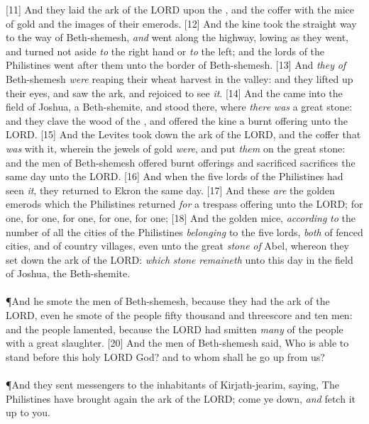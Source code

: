 [11] \textcolor[cmyk]{0.99998,1,0,0}{And they laid the ark of the LORD upon the , and the coffer with the mice of gold and the images of their emerods.}
[12] \textcolor[cmyk]{0.99998,1,0,0}{And the kine took the straight way to the way of Beth-shemesh, \emph{and} went along the highway, lowing as they went, and turned not aside \emph{to} the right hand or \emph{to} the left; and the lords of the Philistines went after them unto the border of Beth-shemesh.}
[13] \textcolor[cmyk]{0.99998,1,0,0}{And \emph{they} \emph{of} Beth-shemesh \emph{were} reaping their wheat harvest in the valley: and they lifted up their eyes, and saw the ark, and rejoiced to see \emph{it}.}
[14] \textcolor[cmyk]{0.99998,1,0,0}{And the  came into the field of Joshua, a Beth-shemite, and stood there, where \emph{there} \emph{was} a great stone: and they clave the wood of the , and offered the kine a burnt offering unto the LORD.}
[15] \textcolor[cmyk]{0.99998,1,0,0}{And the Levites took down the ark of the LORD, and the coffer that \emph{was} with it, wherein the jewels of gold \emph{were}, and put \emph{them} on the great stone: and the men of Beth-shemesh offered burnt offerings and sacrificed sacrifices the same day unto the LORD.}
[16] \textcolor[cmyk]{0.99998,1,0,0}{And when the five lords of the Philistines had seen \emph{it}, they returned to Ekron the same day.}
[17] \textcolor[cmyk]{0.99998,1,0,0}{And these \emph{are} the golden emerods which the Philistines returned \emph{for} a trespass offering unto the LORD; for  one, for  one, for  one, for  one, for  one;}
[18] \textcolor[cmyk]{0.99998,1,0,0}{And the golden mice, \emph{according} \emph{to} the number of all the cities of the Philistines \emph{belonging} to the five lords, \emph{both} of fenced cities, and of country villages, even unto the great \emph{stone} \emph{of} Abel, whereon they set down the ark of the LORD: \emph{which} \emph{stone} \emph{remaineth} unto this day in the field of Joshua, the Beth-shemite.}\\
\\
\P \textcolor[cmyk]{0.99998,1,0,0}{And he smote the men of Beth-shemesh, because they had  the ark of the LORD, even he smote of the people fifty thousand and threescore and ten men: and the people lamented, because the LORD had smitten \emph{many} of the people with a great slaughter.}
[20] \textcolor[cmyk]{0.99998,1,0,0}{And the men of Beth-shemesh said, Who is able to stand before this holy LORD God? and to whom shall he go up from us?}\\
\\
\P \textcolor[cmyk]{0.99998,1,0,0}{And they sent messengers to the inhabitants of Kirjath-jearim, saying, The Philistines have brought again the ark of the LORD; come ye down, \emph{and} fetch it up to you.}